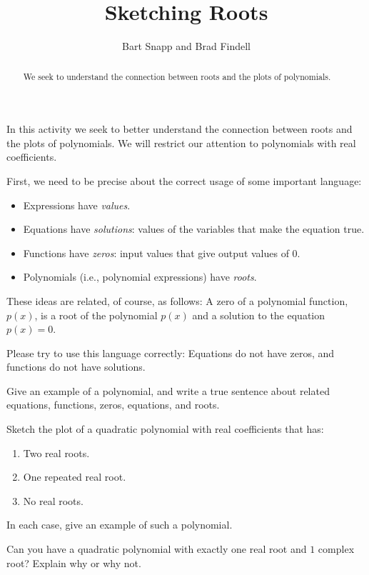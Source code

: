 \documentclass[nooutcomes]{ximera}
\title{Sketching Roots}
\author{Bart Snapp and Brad Findell}
\begin{document}
\begin{abstract}
We seek to understand the connection between roots and the plots of
polynomials.
\end{abstract}
\maketitle

\label{A:sketchRoots}

In this activity we seek to better understand the connection between
roots and the plots of polynomials.  We will restrict our attention to polynomials with real coefficients.  

First, we need to be precise about the correct usage of some important language:  

\begin{itemize}
\item Expressions have \emph{values}.  
\item Equations have \emph{solutions}:  values of the variables that make the equation true. 
\item Functions have \emph{zeros}: input values that give output values of 0.
\item Polynomials (i.e., polynomial expressions) have \emph{roots}.  
\end{itemize}
These ideas are related, of course, as follows:  A zero of a polynomial function, $p(x)$, is a root of the polynomial $p(x)$ and a solution to the equation $p(x) = 0$.  

Please try to use this language correctly:  Equations do not have zeros, and functions do not have solutions.  

\begin{problem}
Give an example of a polynomial, and write a true sentence about related equations, functions, zeros, equations, and roots.  
\end{problem}

\begin{problem}
Sketch the plot of a quadratic polynomial with real coefficients that has:
\begin{enumerate}
\item Two real roots.
\item One repeated real root.
\item No real roots.
\end{enumerate}
In each case, give an example of such a polynomial.
\end{problem}

\begin{problem}
Can you have a quadratic polynomial with exactly one real root and
$1$ complex root?  Explain why or why not.
\end{problem}
\end{document}
